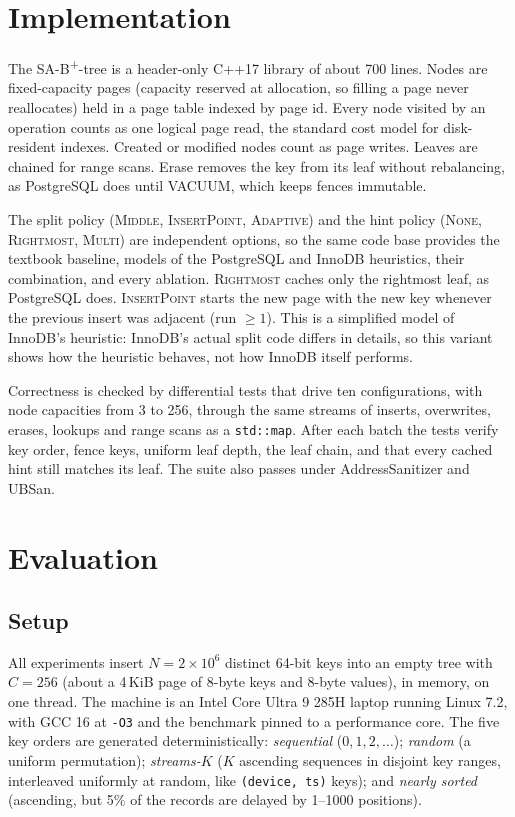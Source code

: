 \documentclass[conference]{IEEEtran}
\newcommand{\sab}{SA-B\textsuperscript{+}-tree}
\begin{document}
\section{Implementation}
\label{sec:impl}
The \sab{} is a header-only C++17 library of about 700 lines. Nodes are
fixed-capacity pages (capacity reserved at allocation, so filling a page
never reallocates) held in a page table indexed by page id. Every node visited
by an operation counts as one logical page read, the standard cost model for
disk-resident indexes. Created or modified nodes count as page writes. Leaves
are chained for range scans. Erase removes the key from its leaf without
rebalancing, as PostgreSQL does until VACUUM, which keeps fences immutable.

The split policy (\textsc{Middle}, \textsc{InsertPoint}, \textsc{Adaptive})
and the hint policy (\textsc{None}, \textsc{Rightmost}, \textsc{Multi}) are
independent options, so the same code base provides the textbook baseline,
models of the PostgreSQL and InnoDB heuristics, their combination, and every
ablation. \textsc{Rightmost} caches only the rightmost leaf, as PostgreSQL
does. \textsc{InsertPoint} starts the new page with the new key whenever the
previous insert was adjacent (run $\ge 1$). This is a simplified model of
InnoDB's heuristic: InnoDB's actual split code differs in details, so this
variant shows how the heuristic behaves, not how InnoDB itself performs.

Correctness is checked by differential tests that drive ten configurations,
with node capacities from 3 to 256, through the same streams of inserts,
overwrites, erases, lookups and range scans as a \texttt{std::map}. After
each batch the tests verify key order, fence keys, uniform leaf depth, the
leaf chain, and that every cached hint still matches its leaf. The suite also
passes under AddressSanitizer and UBSan.

\section{Evaluation}
\label{sec:eval}

\subsection{Setup}
All experiments insert $N=2\times10^6$ distinct 64-bit keys into an empty
tree with $C=256$ (about a 4\,KiB page of 8-byte keys and 8-byte values), in
memory, on one thread. The machine is an Intel Core Ultra 9 285H laptop
running Linux 7.2, with GCC 16 at \texttt{-O3} and the benchmark pinned to a
performance core. The five key orders are generated deterministically:
\emph{sequential} ($0,1,2,\dots$); \emph{random} (a uniform permutation);
\emph{streams-$K$} ($K$ ascending sequences in disjoint key ranges,
interleaved uniformly at random, like \texttt{(device, ts)} keys);
and \emph{nearly sorted} (ascending, but 5\% of the records are delayed by
1--1000 positions).
\end{document}
